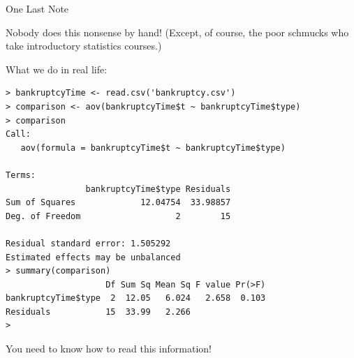 \begin{frame}[fragile]{One Last Note}

  Nobody does this nonsense by hand! (Except, of course, the poor
  schmucks who take introductory statistics courses.)

  What we do in real life:

 {
   \fontsize{5pt}{5pt}
   \selectfont

\begin{verbatim}
> bankruptcyTime <- read.csv('bankruptcy.csv')
> comparison <- aov(bankruptcyTime$t ~ bankruptcyTime$type)
> comparison
Call:
   aov(formula = bankruptcyTime$t ~ bankruptcyTime$type)

Terms:
                bankruptcyTime$type Residuals
Sum of Squares             12.04754  33.98857
Deg. of Freedom                   2        15

Residual standard error: 1.505292
Estimated effects may be unbalanced
> summary(comparison)
                    Df Sum Sq Mean Sq F value Pr(>F)
bankruptcyTime$type  2  12.05   6.024   2.658  0.103
Residuals           15  33.99   2.266               
>
\end{verbatim}
}
 
  You need to know how to read this information!

 
\end{frame}

